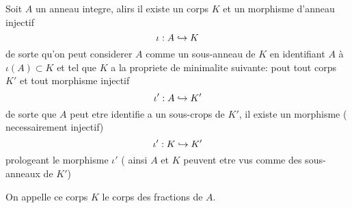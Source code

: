 \documentclass[../main.tex]{subfiles}
\begin{document}
\begin{propo}
Soit $A$ un anneau integre, alirs il existe un corps $K$ et un morphisme d'anneau injectif
\[ 
\iota: A \hookrightarrow K
\]
de sorte qu'on peut considerer $A$ comme un sous-anneau de $K$ en identifiant $A$ à $\iota(A) \subset K$ et tel que $K$ a la propriete de minimalite suivante: pout tout corps $K'$ et tout morphisme injectif
\[ 
\iota' : A \hookrightarrow K'
\]
de sorte que $A$ peut etre identifie a un sous-crops de $K'$, il existe un morphisme ( necessairement injectif) 
\[ 
\iota' : K \hookrightarrow K'
\]
prologeant le morphisme $\iota'$ ( ainsi $A$ et $K$ peuvent etre vus comme des sous-anneaux de  $K'$) 
\end{propo}
\begin{defn}
On appelle ce corps $K$ le corps des fractions de $A$.
\end{defn}
\end{document}
